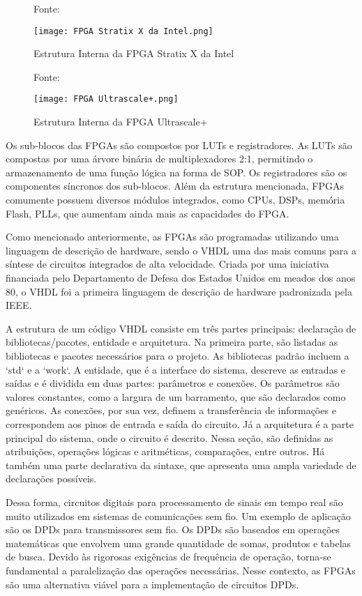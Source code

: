 \begin{figure}[h!]
    \centering
    \captionsetup{justification=centering}
    \caption*{Fonte: \cite{Pedroni2010}}
    \texttt{[image: FPGA Stratix X da Intel.png]}
    \caption{Estrutura Interna da FPGA Stratix X da Intel}
    \label{fig:Stratix}
\end{figure}

\begin{figure}[h!]
    \centering
    \captionsetup{justification=centering}
    \caption*{Fonte: \cite{Pedroni2010}}
    \texttt{[image: FPGA Ultrascale+.png]}
    \caption{Estrutura Interna da FPGA Ultrascale+}
    \label{fig:Ultrascale}
\end{figure}

Os sub-blocos das FPGAs são compostos por LUTs e registradores. As LUTs são compostas por uma árvore binária de multiplexadores 2:1, permitindo o armazenamento de uma função lógica na forma de SOP. Os registradores são os componentes síncronos dos sub-blocos. Além da estrutura mencionada, FPGAs comumente possuem diversos módulos integrados, como CPUs, DSPs, memória Flash, PLLs, que aumentam ainda mais as capacidades do FPGA.

Como mencionado anteriormente, as FPGAs são programadas utilizando uma linguagem de descrição de hardware, sendo o VHDL uma das mais comuns para a síntese de circuitos integrados de alta velocidade. Criada por uma iniciativa financiada pelo Departamento de Defesa dos Estados Unidos em meados dos anos 80, o VHDL foi a primeira linguagem de descrição de hardware padronizada pela IEEE.

A estrutura de um código VHDL consiste em três partes principais: declaração de bibliotecas/pacotes, entidade e arquitetura. Na primeira parte, são listadas as bibliotecas e pacotes necessários para o projeto. As bibliotecas padrão incluem a `std` e a `work`. A entidade, que é a interface do sistema, descreve as entradas e saídas e é dividida em duas partes: parâmetros e conexões. Os parâmetros são valores constantes, como a largura de um barramento, que são declarados como genéricos. As conexões, por sua vez, definem a transferência de informações e correspondem aos pinos de entrada e saída do circuito. Já a arquitetura é a parte principal do sistema, onde o circuito é descrito. Nessa seção, são definidas as atribuições, operações lógicas e aritméticas, comparações, entre outros. Há também uma parte declarativa da sintaxe, que apresenta uma ampla variedade de declarações possíveis.

Dessa forma, circuitos digitais para processamento de sinais em tempo real são muito utilizados em sistemas de comunicações sem fio. Um exemplo de aplicação são os DPDs para transmissores sem fio. Os DPDs são baseados em operações matemáticas que envolvem uma grande quantidade de somas, produtos e tabelas de busca. Devido às rigorosas exigências de frequência de operação, torna-se fundamental a paralelização das operações necessárias. Nesse contexto, as FPGAs são uma alternativa viável para a implementação de circuitos DPDs.


